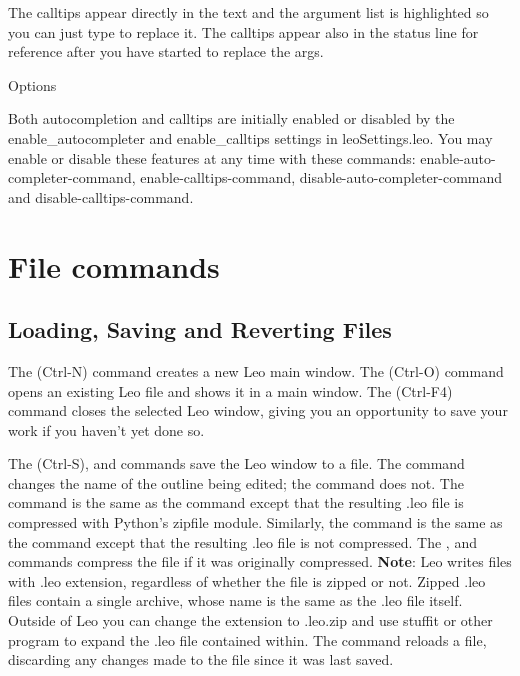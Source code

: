 \documentclass[a4paper,10pt,english]{sphinxmanual}
\begin{document}
The calltips appear directly in the text and the argument list is highlighted so
you can just type to replace it. The calltips appear also in the status line for
reference after you have started to replace the args.

Options

Both autocompletion and calltips are initially enabled or disabled by the
enable\_autocompleter and enable\_calltips settings in leoSettings.leo. You may
enable or disable these features at any time with these commands:
enable-auto-completer-command, enable-calltips-command,
disable-auto-completer-command and disable-calltips-command.


\section{File commands}
\label{commands:file-commands}

\subsection{Loading, Saving and Reverting Files}
\label{commands:loading-saving-and-reverting-files}
The  (Ctrl-N) command creates a new Leo main window. The
 (Ctrl-O) command opens an existing Leo file and shows it
in a main window. The  (Ctrl-F4) command closes the
selected Leo window, giving you an opportunity to save your work if you
haven't yet done so.

The  (Ctrl-S),  and  commands
save the Leo window to a file. The  command changes the
name of the outline being edited; the  command does not.
The  command is the same as the 
command except that the resulting .leo file is compressed with Python's
zipfile module. Similarly, the  command is the
same as the  command except that the resulting .leo file is not
compressed. The ,  and 
commands compress the file if it was originally compressed. \textbf{Note}: Leo
writes files with .leo extension, regardless of whether the file is zipped
or not. Zipped .leo files contain a single archive, whose name is the same
as the .leo file itself. Outside of Leo you can change the extension to
.leo.zip and use stuffit or other program to expand the .leo file contained
within. The  command reloads a file, discarding any changes made
to the file since it was last saved.
\end{document}
